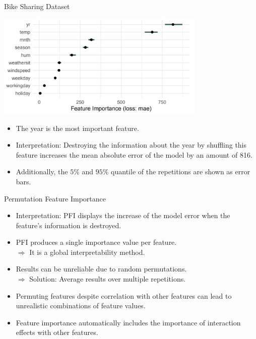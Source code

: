 \documentclass[11pt,compress,t,notes=noshow, xcolor=table]{beamer}
\begin{document}
\begin{vbframe}{Bike Sharing Dataset}

\begin{center}
\includegraphics[width=0.75\textwidth]{figure_man/bike-sharing02.png}
\end{center}

\begin{itemize}
 \item The year is the most important feature.
 \item Interpretation: Destroying the information about the year by shuffling this feature increases the mean absolute error of the model by an amount of 816.
 \item Additionally, the $5 \%$ and $95 \%$ quantile of the repetitions are shown as error bars.
\end{itemize}
\end{vbframe}

\begin{vbframe}{Permutation Feature Importance}
 \begin{itemize}
 \itemsep1em
  \item Interpretation: PFI displays the increase of the model error when the feature's information is destroyed.
  \item PFI produces a single importance value per feature. \\
  $\Rightarrow$ It is a global interpretability method.
  \item Results can be unreliable due to random permutations. \\
  $\Rightarrow$ Solution: Average results over multiple repetitions.
  \item Permuting features despite correlation with other features can lead to unrealistic combinations of feature values.
  \item Feature importance automatically includes the importance of interaction effects with other features.
 \end{itemize}
\end{vbframe}
\end{document}
